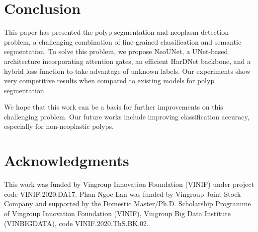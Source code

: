 \documentclass[runningheads]{llncs}
\newcommand{\ModelName}{NeoUNet\xspace}
\begin{document}
	\section{Conclusion}
	\label{sec:conclude}
	This paper has presented the polyp segmentation and neoplasm detection problem, a challenging combination of fine-grained classification and semantic segmentation. To solve this problem, we propose \ModelName, a UNet-based architecture incorporating attention gates, an efficient HarDNet backbone, and a hybrid loss function to take advantage of unknown labels. Our experiments show very competitive results when compared to existing models for polyp segmentation.

	We hope that this work can be a basis for further improvements on this challenging problem. Our future works include improving classification accuracy, especially for non-neoplastic polyps.

	 \section{Acknowledgments}
	 This work was funded by Vingroup Innovation Foundation (VINIF) under project code VINIF.2020.DA17. Phan Ngoc Lan was funded by Vingroup Joint Stock Company and supported by the Domestic Master/Ph.D. Scholarship Programme of Vingroup Innovation Foundation (VINIF), Vingroup Big Data Institute (VINBIGDATA), code VINIF.2020.ThS.BK.02.

	
	
\end{document}
